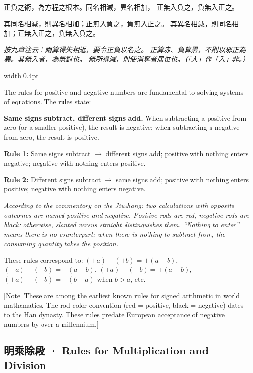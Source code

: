 \documentclass[10pt,a4paper]{article}
\newlength{\cnwidth}
\newlength{\enwidth}
\newcommand{\bilingual}[2]{%
  \noindent%
  \begin{minipage}[t]{\cnwidth}%
    #1%
  \end{minipage}%
  \hfill\vrule width 0.4pt\hfill%
  \begin{minipage}[t]{\enwidth}%
    #2%
  \end{minipage}%
  \par\smallskip%
}
\newcommand{\bilingualsubsection}[2]{%
  \subsection*{#1 · #2}
}
\newcommand{\transnote}[1]{%
  \par\smallskip\noindent\textcolor{notecolor}{\small[Note: #1]}\par\smallskip
}
\begin{document}
\bilingual{%
  正負之術，為方程之根本。同名相減，異名相加，
  正無入負之，負無入正之。

  其同名相減，則異名相加；正無入負之，負無入正之。
  其異名相減，則同名相加；正無入正之，負無入負之。

  \textit{按九章注云：兩算得失相返，要令正負以名之。
  正算赤、負算黑，不則以邪正為異。其無入者，為無對也。
  無所得減，則使消奪者居位也。（「人」作「入」非。）}
}{%
  The rules for positive and negative numbers are fundamental to solving systems
  of equations. The rules state:

  \textbf{Same signs subtract, different signs add.} When subtracting a positive
  from zero (or a smaller positive), the result is negative; when subtracting a
  negative from zero, the result is positive.

  \textbf{Rule 1:} Same signs subtract $\rightarrow$ different signs add;
  positive with nothing enters negative; negative with nothing enters positive.

  \textbf{Rule 2:} Different signs subtract $\rightarrow$ same signs add;
  positive with nothing enters positive; negative with nothing enters negative.

  \textit{According to the commentary on the Jiuzhang: two calculations with opposite
  outcomes are named positive and negative. Positive rods are red, negative rods are black;
  otherwise, slanted versus straight distinguishes them. ``Nothing to enter'' means there
  is no counterpart; when there is nothing to subtract from, the consuming quantity
  takes the position.}

  These rules correspond to: $(+a) - (+b) = +(a-b)$, $(-a) - (-b) = -(a-b)$,
  $(+a) + (-b) = +(a-b)$, $(+a) + (-b) = -(b-a)$ when $b > a$, etc.
}

\transnote{These are among the earliest known rules for signed arithmetic in world mathematics.
The rod-color convention (red = positive, black = negative) dates to the Han dynasty.
These rules predate European acceptance of negative numbers by over a millennium.}

\bilingualsubsection{明乘除段}{Rules for Multiplication and Division}
\end{document}
